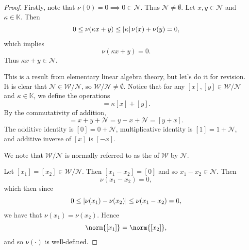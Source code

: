 \documentclass[notoc,notitlepage]{tufte-book}
\begin{document}
\begin{proof}
   Firstly, note that $\nu(0) = 0
  \implies 0 \in \mathcal{N}$. Thus $\mathcal{N} \neq \emptyset$. Let $x, y \in
  \mathcal{N}$ and $\kappa \in \mathbb{K}$. Then
  \begin{equation*}
    0 \leq \nu(\kappa x + y) \leq \left|\kappa\right| \nu(x) + \nu(y) = 0 ,
  \end{equation*}
  which implies
  \begin{equation*}
    \nu(\kappa x + y) = 0.
  \end{equation*}
  Thus $\kappa x + y \in \mathcal{N}$.

  \noindent
  This is a result from elementary linear algebra theory, but let's do it for
  revision. It is clear that $\mathcal{N} \in \mathcal{W} / \mathcal{N}$, so
  $\mathcal{W} / \mathcal{N} \neq \emptyset$. Notice that for any $[x], [y] \in
  \mathcal{W} / \mathcal{N}$ and $\kappa \in \mathbb{K}$, we define the
  operations
  \begin{equation*}
    [\kappa x + y] = \kappa [x] + [y].
  \end{equation*}
  By the commutativity of addition,
  \begin{equation*}
    [x + y] = x + y + \mathcal{N} = y + x + \mathcal{N} = [y + x].
  \end{equation*}
  The additive identity is $[0] = 0 + \mathcal{N}$, multiplicative identity is
  $[1] = 1 + \mathcal{N}$, and additive inverse of $[x]$ is $[-x]$.

  We note that $\mathcal{W} / \mathcal{N}$ is normally referred to as the
   of $\mathcal{W}$ by $\mathcal{N}$.

  \noindent
   Let $[x_1] = [x_2] \in
  \mathcal{W} / \mathcal{N}$. Then $[x_1 - x_2] = [0]$ and so $x_1 - x_2 \in
  \mathcal{N}$. Then
  \begin{equation*}
    \nu(x_1 - x_2) = 0,
  \end{equation*}
  which then since
  \begin{equation*}
    0 \leq \left|\nu(x_1) - \nu(x_2)\right| \leq \nu(x_1 - x_2) = 0,
  \end{equation*}
  we have that $\nu(x_1) = \nu(x_2)$. Hence
  \begin{equation*}
    \norm{[x_1]} = \norm{[x_2]},
  \end{equation*}
  and so $\nu(\cdot)$ is well-defined.


\end{proof}
\end{document}

